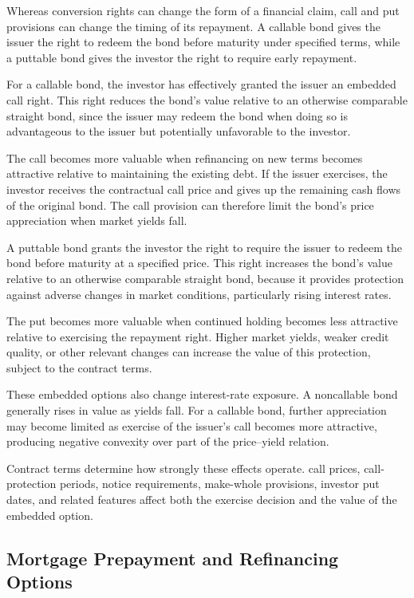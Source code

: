 Whereas conversion rights can change the form of a financial claim, call and put provisions can change the timing of its repayment. A callable bond gives the issuer the right to redeem the bond before maturity under specified terms, while a puttable bond gives the investor the right to require early repayment.

For a callable bond, the investor has effectively granted
the issuer an embedded call right. This right reduces the
bond's value relative to an otherwise comparable straight
bond, since the issuer may redeem the bond when doing so
is advantageous to the issuer but potentially unfavorable
to the investor.

The call becomes more valuable when refinancing on new terms becomes attractive relative to maintaining the existing debt. If the issuer exercises, the investor receives the contractual call price and gives up the remaining cash flows of the original bond. The call provision can therefore limit the bond's price appreciation when market yields fall.

A puttable bond grants the investor the right to require
the issuer to redeem the bond before maturity at a
specified price. This right increases the bond's value
relative to an otherwise comparable straight bond,
because it provides protection against adverse changes
in market conditions, particularly rising interest rates.

The put becomes more valuable when continued holding becomes less attractive relative to exercising the repayment right. Higher market yields, weaker credit quality, or other relevant changes can increase the value of this protection, subject to the contract terms.

These embedded options also change interest-rate exposure. A noncallable bond generally rises in value as yields fall. For a callable bond, further appreciation may become limited as exercise of the issuer's call becomes more attractive, producing negative convexity over part of the price--yield relation.

Contract terms determine how strongly these effects operate. call prices, call-protection periods, notice requirements, make-whole provisions, investor put dates, and related features affect both the exercise decision and the value of the embedded option.

\subsection{Mortgage Prepayment and Refinancing Options}

